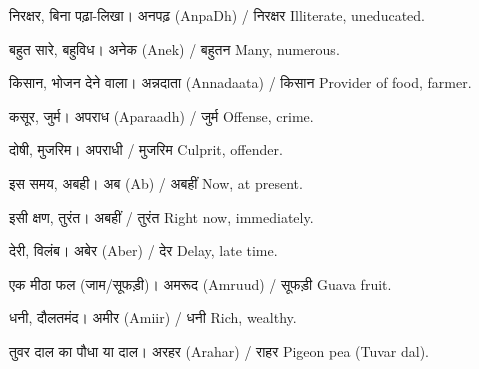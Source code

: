 %
{निरक्षर, बिना पढ़ा-लिखा।}%
{अनपढ़ (AnpaDh) / निरक्षर}%
{Illiterate, uneducated.}

%
{बहुत सारे, बहुविध।}%
{अनेक (Anek) / बहुतन}%
{Many, numerous.}

%
{किसान, भोजन देने वाला।}%
{अन्नदाता (Annadaata) / किसान}%
{Provider of food, farmer.}

%
{कसूर, जुर्म।}%
{अपराध (Aparaadh) / जुर्म}%
{Offense, crime.}

%
{दोषी, मुजरिम।}%
{अपराधी / मुजरिम}%
{Culprit, offender.}

%
{इस समय, अबही।}%
{अब (Ab) / अबहीं}%
{Now, at present.}

%
{इसी क्षण, तुरंत।}%
{अबहीं / तुरंत}%
{Right now, immediately.}

%
{देरी, विलंब।}%
{अबेर (Aber) / देर}%
{Delay, late time.}

%
{एक मीठा फल (जाम/सूफड़ी)।}%
{अमरूद (Amruud) / सूफड़ी}%
{Guava fruit.}

%
{धनी, दौलतमंद।}%
{अमीर (Amiir) / धनी}%
{Rich, wealthy.}

%
{तुवर दाल का पौधा या दाल।}%
{अरहर (Arahar) / राहर}%
{Pigeon pea (Tuvar dal).}

